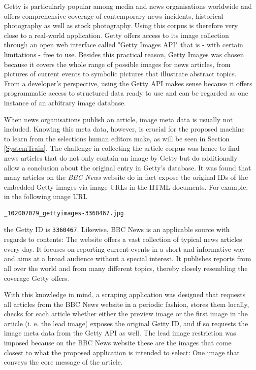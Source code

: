 \documentclass[11pt,a4paper,twoside]{article}
\begin{document}
Getty is particularly popular among media and news organisations worldwide and offers comprehensive coverage of contemporary news incidents, historical photography as well as stock photography. Using this corpus is therefore very close to a real-world application. Getty offers access to its image collection through an open web interface called "Getty Images API" \cite{GettyImagesAPIOverview} that is - with certain limitations - free to use. Besides this practical reason, Getty Images was chosen because it covers the whole range of possible images for news articles, from pictures of current events to symbolic pictures that illustrate abstract topics. From a developer's perspective, using the Getty API makes sense because it offers programmatic access to structured data ready to use and can be regarded as one instance of an arbitrary image database.

When news organisations publish an article, image meta data is usually not included. Knowing this meta data, however, is crucial for the proposed machine to learn from the selections human editors make, as will be seen in Section \ref{SystemTrain}. The challenge in collecting the article corpus was hence to find news articles that do not only contain an image by Getty but do additionally allow a conclusion about the original entry in Getty's database. It was found that many articles on the \emph{BBC News} website \cite{BBCBBCNews} do in fact expose the original IDs of the embedded Getty images via image URLs in the HTML documents. For example, in the following image URL

\begin{lstlisting}
_102007079_gettyimages-3360467.jpg
\end{lstlisting}

\noindent the Getty ID is \lstinline{3360467}. Likewise, BBC News is an applicable source with regards to contents: The website offers a vast collection of typical news articles every day. It focuses on reporting current events in a short and informative way and aims at a broad audience without a special interest. It publishes reports from all over the world and from many different topics, thereby closely resembling the coverage Getty offers.

With this knowledge in mind, a scraping application was designed that requests all articles from the BBC News website in a periodic fashion, stores them locally, checks for each article whether either the preview image or the first image in the article (i. e.  the lead image) exposes the original Getty ID, and if so requests the image meta data from the Getty API as well. The lead image restriction was imposed because on the BBC News website these are the images that come closest to what the proposed application is intended to select: One image that conveys the core message of the article.
\end{document}
